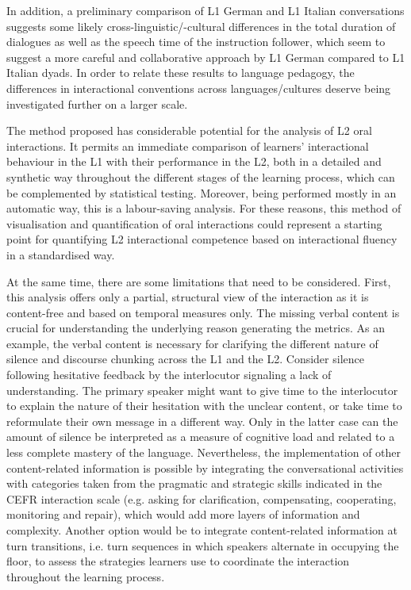 In addition, a preliminary comparison of L1 German and L1 Italian conversations suggests some likely cross-linguistic/-cultural differences in the total duration of dialogues as well as the speech time of the instruction follower, which seem to suggest a more careful and collaborative approach by L1 German compared to L1 Italian dyads. In order to relate these results to language pedagogy, the differences in interactional conventions across languages/cultures deserve being investigated further on a larger scale.

The method proposed has considerable potential for the analysis of L2 oral interactions. It permits an immediate comparison of learners’ interactional behaviour in the L1 with their performance in the L2, both in a detailed and synthetic way throughout the different stages of the learning process, which can be complemented by statistical testing. Moreover, being performed mostly in an automatic way, this is a labour-saving analysis. For these reasons, this method of visualisation and quantification of oral interactions could represent a starting point for quantifying L2 interactional competence based on interactional fluency in a standardised way.

At the same time, there are some limitations that need to be considered. First, this analysis offers only a partial, structural view of the interaction as it is content-free and based on temporal measures only. The missing verbal content is crucial for understanding the underlying reason generating the metrics. As an example, the verbal content is necessary for clarifying the different nature of silence and discourse chunking across the L1 and the L2. Consider silence following hesitative feedback by the interlocutor signaling a lack of understanding. The primary speaker might want to give time to the interlocutor to explain the nature of their hesitation with the unclear content, or take time to reformulate their own message in a different way. Only in the latter case can the amount of silence be interpreted as a measure of cognitive load and related to a less complete mastery of the language. Nevertheless, the implementation of other content-related information is possible by integrating the conversational activities with categories taken from the pragmatic and strategic skills indicated in the CEFR interaction scale (e.g. asking for clarification, compensating, cooperating, monitoring and repair), which would add more layers of information and complexity. Another option would be to integrate content-related information at turn transitions, i.e. turn sequences in which speakers alternate in occupying the floor, to assess the strategies learners use to coordinate the interaction throughout the learning process.

